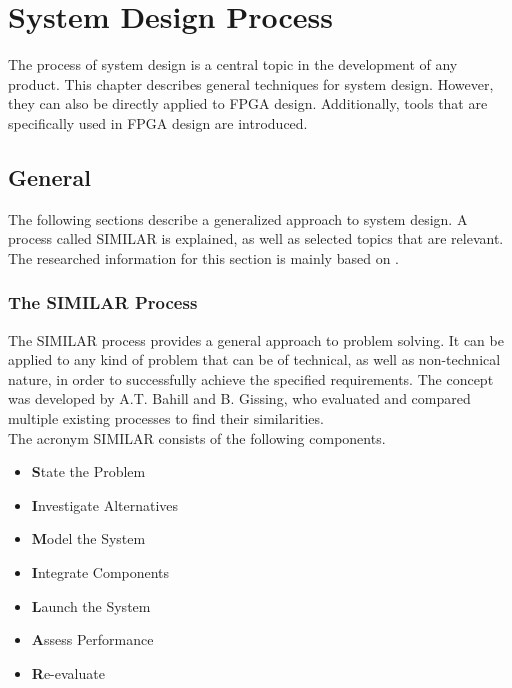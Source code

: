 \chapter{System Design Process}
\label{cha:SystemDesignProcess}

The process of system design is a central topic in the development of any product.
This chapter describes general techniques for system design.
However, they can also be directly applied to FPGA design.
Additionally, tools that are specifically used in FPGA design are introduced.

\section{General}

The following sections describe a generalized approach to system design.
A process called SIMILAR is explained, as well as selected topics that are relevant.
The researched information for this section is mainly based on \cite{BahillA.Terry2017TDiS}.

\subsection{The SIMILAR Process}
\label{sec:SimilarProcess}

The SIMILAR process provides a general approach to problem solving.
It can be applied to any kind of problem that can be of technical, as well as non-technical nature, in order to successfully achieve the specified requirements.
The concept was developed by A.T. Bahill and B. Gissing, who evaluated and compared multiple existing processes to find their similarities.\\

\noindent
The acronym SIMILAR consists of the following components.

\begin{itemize}
  \item \textbf{S}tate the Problem
  \item \textbf{I}nvestigate Alternatives
  \item \textbf{M}odel the System
  \item \textbf{I}ntegrate Components
  \item \textbf{L}aunch the System
  \item \textbf{A}ssess Performance
  \item \textbf{R}e-evaluate\\
\end{itemize}

